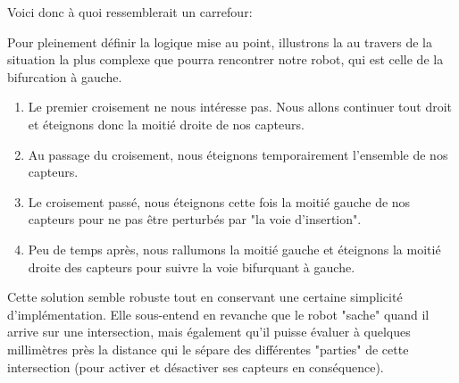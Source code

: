 		Voici donc à quoi ressemblerait un carrefour:

		Pour pleinement définir la logique mise au point, illustrons la au travers de la situation la plus complexe que pourra rencontrer notre robot, qui est celle de la bifurcation à gauche.


		\begin{enumerate}
			\item Le premier croisement ne nous intéresse pas. Nous allons continuer tout droit et éteignons donc la moitié droite de nos capteurs.
			\item Au passage du croisement, nous éteignons temporairement l'ensemble de nos capteurs.
			\item Le croisement passé, nous éteignons cette fois la moitié gauche de nos capteurs pour ne pas être perturbés par "la voie d'insertion".
			\item Peu de temps après, nous rallumons la moitié gauche et éteignons la moitié droite des capteurs pour suivre la voie bifurquant à gauche.
		\end{enumerate}

		Cette solution semble robuste tout en conservant une certaine simplicité d’implémentation. Elle sous-entend en revanche que le robot "sache" quand il arrive sur une intersection, mais également qu'il puisse évaluer à quelques millimètres près la distance qui le sépare des différentes "parties" de cette intersection (pour activer et désactiver ses capteurs en conséquence).\\

